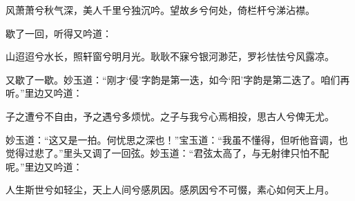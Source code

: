 \begin{poem}
    \begin{pl}
        风萧萧兮秋气深，美人千里兮独沉吟。望故乡兮何处，倚栏杆兮涕沾襟。
    \end{pl}
\end{poem}


\begin{parag}
    歇了一回，听得又吟道：
\end{parag}


\begin{poem}
    \begin{pl}
        山迢迢兮水长，照轩窗兮明月光。耿耿不寐兮银河渺茫，罗衫怯怯兮风露凉。
    \end{pl}
\end{poem}


\begin{parag}
    又歇了一歇。妙玉道：“刚才‘侵’字韵是第一迭，如今‘阳’字韵是第二迭了。咱们再听。”里边又吟道：
\end{parag}

\begin{poem}
    \begin{pl}
        子之遭兮不自由，予之遇兮多烦忧。之子与我兮心焉相投，思古人兮俾无尤。
    \end{pl}
\end{poem}


\begin{parag}
    妙玉道：“这又是一拍。何忧思之深也！”宝玉道：“我虽不懂得，但听他音调，也觉得过悲了。”里头又调了一回弦。妙玉道：“君弦太高了，与无射律只怕不配呢。”里边又吟道：
\end{parag}

\begin{poem}
    \begin{pl}
        人生斯世兮如轻尘，天上人间兮感夙因。感夙因兮不可惙，素心如何天上月。
    \end{pl}
\end{poem}


